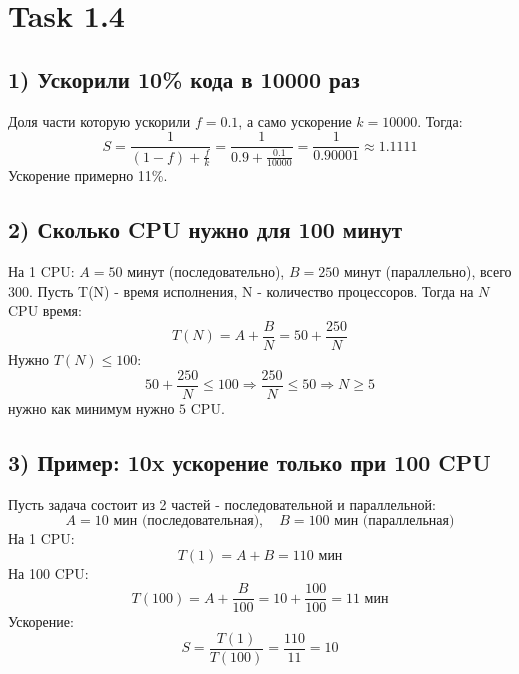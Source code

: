 \documentclass{article}
\begin{document}
\small

\section*{Task 1.4}

\subsection*{1) Ускорили 10\% кода в 10000 раз}

Доля части которую ускорили $f=0.1$, а само ускорение $k=10000$.
Тогда:
\[
S=\frac{1}{(1-f)+\frac{f}{k}}=\frac{1}{0.9+\frac{0.1}{10000}}=\frac{1}{0.90001}\approx 1.1111
\]
Ускорение примерно 11\%.

\subsection*{2) Сколько CPU нужно для 100 минут}

На 1 CPU: $A=50$ минут (последовательно), $B=250$ минут (параллельно), всего $300$.
Пусть T(N) - время исполнения, N - количество процессоров. Тогда на $N$ CPU время:
\[
T(N)=A+\frac{B}{N}=50+\frac{250}{N}
\]
Нужно $T(N)\le 100$:
\[
50+\frac{250}{N}\le 100 \Rightarrow \frac{250}{N}\le 50 \Rightarrow N\ge 5
\]
нужно как минимум нужно $5$ CPU.

\subsection*{3) Пример: 10x ускорение только при 100 CPU}

Пусть задача состоит из 2 частей - последовательной и параллельной:
\[
A=10\text{ мин (последовательная)},\quad B=100\text{ мин (параллельная)}
\]
На 1 CPU:
\[
T(1)=A+B=110\text{ мин}
\]
На 100 CPU:
\[
T(100)=A+\frac{B}{100}=10+\frac{100}{100}=11\text{ мин}
\]
Ускорение:
\[
S=\frac{T(1)}{T(100)}=\frac{110}{11}=10
\]
\end{document}
